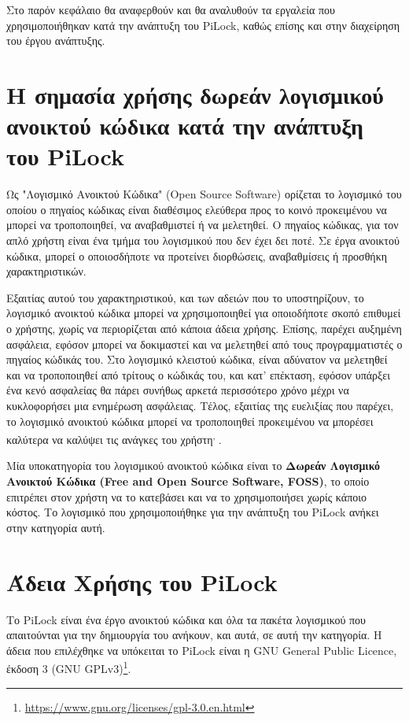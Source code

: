 Στο παρόν κεφάλαιο θα αναφερθούν και θα αναλυθούν τα εργαλεία που χρησιμοποιήθηκαν κατά την ανάπτυξη του PiLock, καθώς επίσης και στην διαχείρηση του έργου ανάπτυξης.

\section{Η σημασία χρήσης δωρεάν λογισμικού ανοικτού κώδικα κατά την ανάπτυξη του PiLock}
	\label{foss_benefits}
	Ως "Λογισμικό Ανοικτού Κώδικα" (Open Source Software) ορίζεται το λογισμικό του οποίου ο πηγαίος κώδικας είναι διαθέσιμος ελεύθερα προς το κοινό προκειμένου να μπορεί να τροποποιηθεί, να αναβαθμιστεί ή να μελετηθεί. Ο πηγαίος κώδικας, για τον απλό χρήστη είναι ένα τμήμα του λογισμικού που δεν έχει δει ποτέ. Σε έργα ανοικτού κώδικα, μπορεί ο οποιοσδήποτε να προτείνει διορθώσεις, αναβαθμίσεις ή προσθήκη χαρακτηριστικών\textsuperscript{\cite{FOSS_def}}. 

	Εξαιτίας αυτού του χαρακτηριστικού, και των αδειών που το υποστηρίζουν, το λογισμικό ανοικτού κώδικα μπορεί να χρησιμοποιηθεί για οποιοδήποτε σκοπό επιθυμεί ο χρήστης, χωρίς να περιορίζεται από κάποια άδεια χρήσης. Επίσης, παρέχει αυξημένη ασφάλεια, εφόσον μπορεί να δοκιμαστεί και να μελετηθεί από τους προγραμματιστές ο πηγαίος κώδικάς του. Στο λογισμικό κλειστού κώδικα, είναι αδύνατον να μελετηθεί και να τροποποιηθεί από τρίτους ο κώδικάς του, και κατ' επέκταση, εφόσον υπάρξει ένα κενό ασφαλείας θα πάρει συνήθως αρκετά περισσότερο χρόνο μέχρι να κυκλοφορήσει μια ενημέρωση ασφάλειας. Τέλος, εξαιτίας της ευελιξίας που παρέχει, το λογισμικό ανοικτού κώδικα μπορεί να τροποποιηθεί προκειμένου να μπορέσει καλύτερα να καλύψει τις ανάγκες του χρήστη\textsuperscript{\cite{FOSS_def}, \cite{FOSS_benefits}}.

	Μία υποκατηγορία του λογισμικού ανοικτού κώδικα είναι το \textbf{Δωρεάν Λογισμικό Ανοικτού Κώδικα (Free and Open Source Software, FOSS)}, το οποίο επιτρέπει στον χρήστη να το κατεβάσει και να το χρησιμοποιήσει χωρίς κάποιο κόστος. Το λογισμικό που χρησιμοποιήθηκε για την ανάπτυξη του PiLock ανήκει στην κατηγορία αυτή.

\section{Άδεια Χρήσης του PiLock}
	Το PiLock είναι ένα έργο ανοικτού κώδικα και όλα τα πακέτα λογισμικού που απαιτούνται για την δημιουργία του ανήκουν, και αυτά, σε αυτή την κατηγορία. Η άδεια που επιλέχθηκε να υπόκειται το PiLock είναι η GNU General Public Licence, έκδοση 3 (GNU GPLv3)\footnote{\url{https://www.gnu.org/licenses/gpl-3.0.en.html}}.

